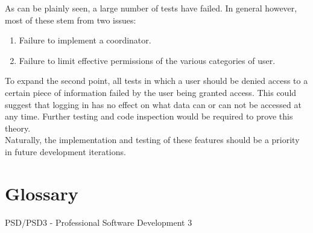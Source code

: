 \documentclass{l3deliverable}
\begin{document}
As can be plainly seen, a large number of tests have failed. In general however, most of these stem from two issues:
\begin{enumerate}
\item{Failure to implement a coordinator.}
\item{Failure to limit effective permissions of the various categories of user.}
\end{enumerate}
To expand the second point, all tests in which a user should be denied access to a certain piece of information failed by the user being granted access. This could suggest that logging in has no effect on what data can or can not be accessed at any time. Further testing and code inspection would be required to prove this theory.\\
Naturally, the implementation and testing of these features should be a priority in future development iterations.\\

\appendix

\section{Glossary}
PSD/PSD3 - Professional Software Development 3
\end{document}
